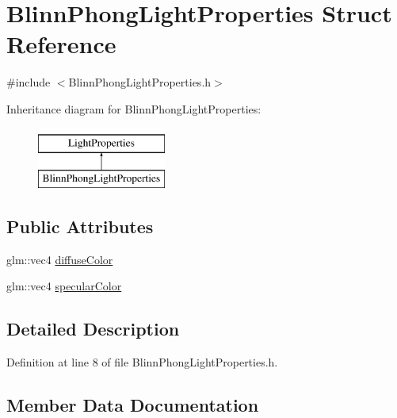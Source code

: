 \hypertarget{struct_blinn_phong_light_properties}{}\section{Blinn\+Phong\+Light\+Properties Struct Reference}
\label{struct_blinn_phong_light_properties}


{\ttfamily \#include $<$Blinn\+Phong\+Light\+Properties.\+h$>$}

Inheritance diagram for Blinn\+Phong\+Light\+Properties\+:\begin{figure}[H]
\begin{center}
\leavevmode
\includegraphics[height=2.000000cm]{struct_blinn_phong_light_properties}
\end{center}
\end{figure}
\subsection*{Public Attributes}
\begin{DoxyCompactItemize}
\item 
glm\+::vec4 \hyperlink{struct_blinn_phong_light_properties_aa12c81d848d370b8f79c9384d9fafec0}{diffuse\+Color}
\item 
glm\+::vec4 \hyperlink{struct_blinn_phong_light_properties_a815238c4f235333affb85f949ff8df06}{specular\+Color}
\end{DoxyCompactItemize}


\subsection{Detailed Description}


Definition at line 8 of file Blinn\+Phong\+Light\+Properties.\+h.



\subsection{Member Data Documentation}
\hypertarget{struct_blinn_phong_light_properties_aa12c81d848d370b8f79c9384d9fafec0}{}
